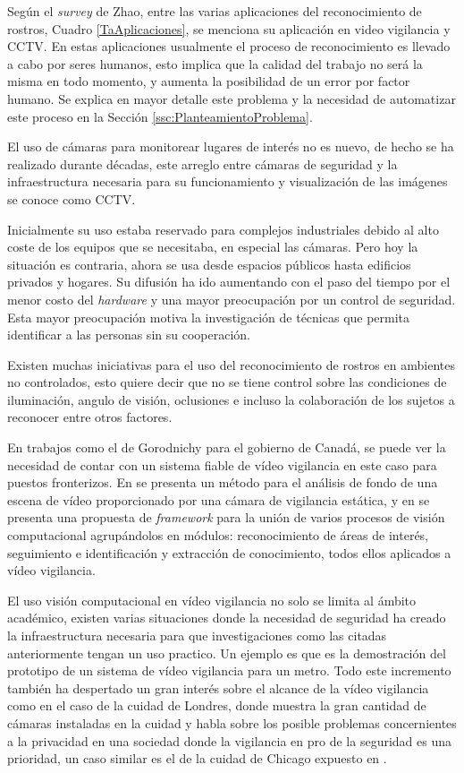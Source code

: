Según el \textit{survey} de Zhao\cite{zhao2003face}, entre las varias aplicaciones del reconocimiento de rostros, Cuadro \ref{TaAplicaciones}, se menciona su aplicación en video vigilancia y \ac{CCTV}. En estas aplicaciones usualmente el proceso de reconocimiento es llevado a cabo por seres humanos, esto implica que la calidad del trabajo no será la misma en todo momento, y aumenta la posibilidad de un error por factor humano. Se explica en mayor detalle este problema y la necesidad de automatizar este proceso en la Sección \ref{ssc:PlanteamientoProblema}.

El uso de cámaras para monitorear lugares de interés no es nuevo, de hecho se ha realizado durante décadas, este arreglo entre cámaras de seguridad y la infraestructura necesaria para su funcionamiento y visualización de las imágenes se conoce como \ac{CCTV}. 

Inicialmente su uso estaba reservado para complejos industriales debido al alto coste de los equipos que se necesitaba, en especial las cámaras. Pero hoy la situación es contraria, ahora se usa desde espacios públicos hasta edificios privados y hogares. Su difusión ha ido aumentando con el paso del tiempo por el menor costo del \textit{hardware} y una mayor preocupación por un control de seguridad. Esta mayor preocupación motiva la investigación de técnicas que permita identificar a las personas sin su cooperación.

Existen muchas iniciativas para el uso del reconocimiento de rostros en ambientes no controlados, esto quiere decir que no se tiene control sobre las condiciones de iluminación, angulo de visión, oclusiones e incluso la colaboración de los sujetos a reconocer entre otros factores.
 
En trabajos como el de Gorodnichy \cite{gorodnichy2014survey} para el gobierno de Canadá, se puede ver la necesidad de contar con un sistema fiable de vídeo vigilancia en este caso para puestos fronterizos. En  \cite{tian2005robust} se presenta un método para el análisis de fondo de una escena de vídeo proporcionado por una cámara de vigilancia estática, y en \cite{nazare2014smart} se presenta una propuesta de \textit{framework} para la unión de varios procesos de visión computacional agrupándolos en módulos: reconocimiento de áreas de interés, seguimiento e identificación y extracción de conocimiento, todos ellos aplicados a vídeo vigilancia.

El uso visión computacional en vídeo vigilancia no solo se limita al ámbito académico, existen varias situaciones donde la necesidad de seguridad ha creado la infraestructura necesaria para que investigaciones como las citadas anteriormente tengan un uso practico. Un ejemplo es \cite{odobez2012unsupervised} que es la demostración del prototipo de un sistema de vídeo vigilancia para un metro. Todo este incremento también ha despertado un gran interés sobre el alcance de la vídeo vigilancia como en el caso de la cuidad de Londres, donde \cite{wood2006report} muestra la gran cantidad de cámaras instaladas en la cuidad y habla sobre los posible problemas concernientes a la privacidad en una sociedad donde la vigilancia en pro de la seguridad es una prioridad, un caso similar es el de la cuidad de Chicago expuesto en \cite{schwartz2012chicago}.

